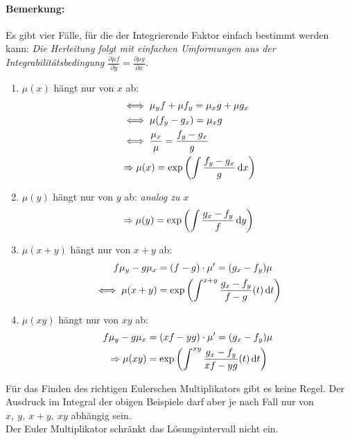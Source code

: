\paragraph{Bemerkung:} Es gibt vier Fälle, für die der Integrierende Faktor einfach bestimmt werden kann: \textit{Die Herleitung folgt mit einfachen Umformungen aus der Integrabilitätsbedingung $\frac{\partial \mu f}{\partial y} = \frac{\partial \mu g}{\partial x}$.}
\begin{enumerate}[label=\roman*)]
    \item $\mu(x)$ hängt nur von $x$ ab:
        \begin{align*}
            &\iff \mu_y f + \mu f_y = \mu_x g + \mu g_x \\
            &\iff \mu (f_y-g_x) = \mu_x g \\
            &\iff \frac{\mu_x}{\mu} = \frac{f_y-g_x}{g}\\
            &\Rightarrow \mu(x) = \exp{\left(\int \frac{f_y-g_x}{g} \mathop{}\!\mathrm{d}x \right)} 
        \end{align*}
    
    \item $\mu(y)$ hängt nur von $y$ ab:
        \textit{analog zu $x$}
        \begin{align*}
            \Rightarrow \mu(y) = \exp \left (\int \frac{g_x-f_y}{f} \mathop{}\!\mathrm{d} y \right)
        \end{align*}
    
    \item $\mu(x+y)$ hängt nur von $x+y$ ab:
        \begin{align*}
            f\mu_y - g\mu_x &= (f-g)\cdot\mu' = (g_x-f_y)\mu \\
            \iff \mu(x+y) &= \exp \left( \int^{x+y} \frac{g_x-f_y}{f-g}(t) \mathop{}\!\mathrm{d} t \right)
        \end{align*}
        
    \item $\mu(xy)$ hängt nur von $xy$ ab:
        \begin{align*}
            f\mu_y-g\mu_x &= (xf-yg)\cdot\mu' = (g_x-f_y)\mu \\
            \Rightarrow \mu(xy) &= \exp \left( \int^{xy} \frac{g_x-f_y}{xf-yg}(t) \mathop{}\!\mathrm{d} t \right)
        \end{align*}
    
\end{enumerate}

Für das Finden des richtigen Eulerschen Multiplikators gibt es keine Regel.
Der Ausdruck im Integral der obigen Beispiele darf aber je nach Fall nur von $x,\ y,\ x+y,\ xy$ abhängig sein. \\
Der Euler Multiplikator schränkt das Lösungsintervall nicht ein.


